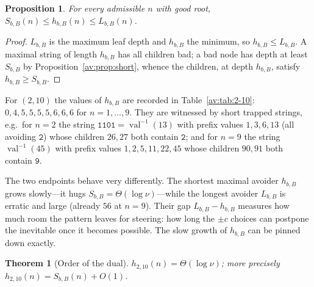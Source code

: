 \documentclass[a4paper]{article}
\theoremstyle{plain}
\newtheorem{theorem}{Theorem}[subsection]
\newtheorem{proposition}{Proposition}[subsection]
\theoremstyle{definition}
\theoremstyle{remark}
\DeclareMathOperator{\val}{val}
\newcommand{\Lbb}[1][b,B]{L_{#1}}
\newcommand{\Sbb}[1][b,B]{S_{#1}}
\newcommand{\hbb}[1][b,B]{h_{#1}}
\begin{document}
\begin{proposition}\label{av:prop:sandwich}
For every admissible $n$ with good root, $\Sbb(n)\le \hbb(n)\le \Lbb(n)$.
\end{proposition}

\begin{proof}
$\Lbb$ is the maximum leaf depth and $\hbb$ the minimum, so $\hbb\le\Lbb$. A maximal string of length $\hbb$ has all children bad; a bad node has depth at least $\Sbb$ by Proposition~\ref{av:prop:short}, whence the children, at depth $\hbb$, satisfy $\hbb\ge\Sbb$.
\end{proof}

For $(2,10)$ the values of $\hbb$ are recorded in Table~\ref{av:tab:2-10}: $0,4,5,5,5,5,6,6,6$ for $n=1,\dots,9$. They are witnessed by short trapped strings, e.g.\ for $n=2$ the string $\texttt{1101}=\val^{-1}(13)$ with prefix values $1,3,6,13$ (all avoiding $\texttt{2}$) whose children $26,27$ both contain $\texttt{2}$; and for $n=9$ the string $\val^{-1}(45)$ with prefix values $1,2,5,11,22,45$ whose children $90,91$ both contain $\texttt{9}$.

The two endpoints behave very differently. The shortest maximal avoider $\hbb$ grows slowly---it hugs $\Sbb=\Theta(\log\nu)$---while the longest avoider $\Lbb$ is erratic and large (already $56$ at $n=9$). Their gap $\Lbb-\hbb$ measures how much room the pattern leaves for steering: how long the $\pm c$ choices can postpone the inevitable once it becomes possible. The slow growth of $\hbb$ can be pinned down exactly.

\begin{theorem}[Order of the dual]\label{av:thm:dual}
$\hbb[2,10](n)=\Theta(\log\nu)$; more precisely $\hbb[2,10](n)=\Sbb(n)+O(1)$.
\end{theorem}
\end{document}
